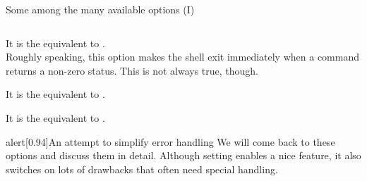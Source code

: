 \begin{frame}{Some among the many available options (I)}
\begin{columns}
\begin{column}{\dimexpr\paperwidth-10mm}
\begin{onlyenv}
\begin{description}
                        It is the equivalent to .\\
                        Roughly speaking, this option makes the shell exit immediately when a command returns a non-zero status.
                        This is not always true, though.
                    \item[\PB{\texttt{-o errtrace}}]
                        It is the equivalent to .
                    \item[\PB{\texttt{-o functrace}}]
                        It is the equivalent to .
                \end{description}
                \begin{varblock}{alert}[0.94\textwidth]{An attempt to simplify error handling}
                    We will come back to these options and discuss them in detail.
                    Although setting  enables a nice feature, it also switches on lots of drawbacks that often need special handling.
                \end{varblock}
                \vspace{-2mm}
                \begin{center}
                \end{center}
            \end{onlyenv}
        \end{column}
    \end{columns}
\end{frame}
